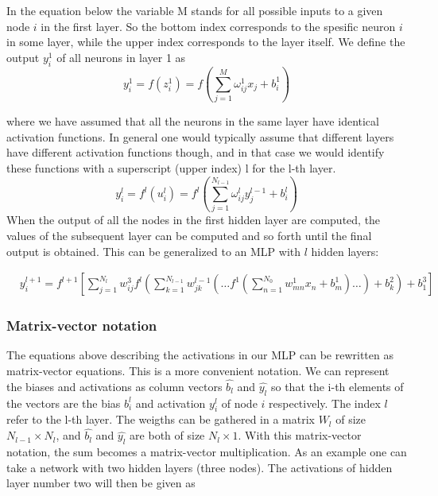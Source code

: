 \documentclass[a4paper,12pt]{article}
\begin{document}
In the equation below the variable M stands for all possible inputs to a given node $i$ in the first layer. So the bottom index corresponds to the spesific neuron $i$ in some layer, while the upper index corresponds to the layer itself. We define the output $y_i^1$ of all neurons in layer 1 as
\begin{equation}
    y_i^1 = f(z_i^1) = f( \sum_{j=1}^M \omega_{ij}^1 x_j + b_i^1 )
\end{equation}

where we have assumed that all the neurons in the same layer have identical activation functions. In general one would typically assume that different layers have different activation functions though, and in that case we would identify these functions with a superscript (upper index) l for the l-th layer.
\begin{equation}
    y_i^l = f^l(u_i^l) = f^l( \sum_{j=1}^{N_{l-1}} \omega_{ij}^l y_j^{l-1} + b_i^l )
\end{equation}
When the output of all the nodes in the first hidden layer are computed, the values of the subsequent layer can be computed and so forth until the final output is obtained.\newline
This can be generalized to an MLP with $l$ hidden layers:

\begin{align}
&y^{l+1}_i = f^{l+1}\left[\!\sum_{j=1}^{N_l} w_{ij}^3 f^l\left(\sum_{k=1}^{N_{l-1}}w_{jk}^{l-1}\left(\dots f^1\left(\sum_{n=1}^{N_0} w_{mn}^1 x_n+ b_m^1\right)\dots\right)+b_k^2\right)+b_1^3\right]
\end{align}


\subsubsection{Matrix-vector notation}
The equations above describing the activations in our MLP can be rewritten as matrix-vector equations. This is a more convenient notation.\newline
We can represent the biases and activations as column vectors $\hat{b_l}$ and $\hat{y_l}$ so that the i-th elements of the vectors are the bias $b_i^l$ and activation $y_i^l$ of node $i$ respectively. The index $l$ refer to the l-th layer.\newline
The weigths can be gathered in a matrix $W_l$ of size $N_{l-1} \times N_l$, and $\hat{b_l}$ and $\hat{y_l}$ are both of size $N_l \times 1$. With this matrix-vector notation, the sum becomes a matrix-vector multiplication. As an example one can take a network with two hidden layers (three nodes). The activations of hidden layer number two will then be given as
\end{document}
